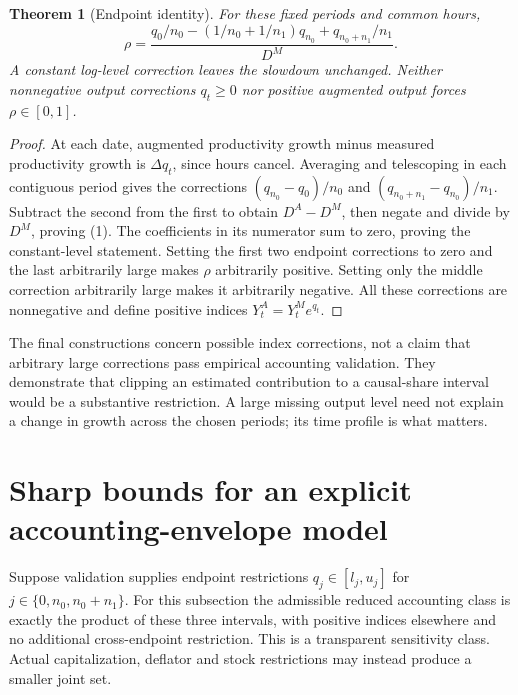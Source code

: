 \documentclass[11pt]{article}
\newtheorem{theorem}{Theorem}
\theoremstyle{definition}
\begin{document}
\begin{theorem}[Endpoint identity]
For these fixed periods and common hours,
\[
 \rho=\frac{q_0/n_0-(1/n_0+1/n_1)q_{n_0}
                     +q_{n_0+n_1}/n_1}{D^M}.
 \tag{1}
\]
A constant log-level correction leaves the slowdown unchanged. Neither nonnegative output corrections $q_t\ge0$ nor positive augmented output forces $\rho\in[0,1]$.
\end{theorem}
\begin{proof}
At each date, augmented productivity growth minus measured productivity growth is $\Delta q_t$, since hours cancel. Averaging and telescoping in each contiguous period gives the corrections $(q_{n_0}-q_0)/n_0$ and $(q_{n_0+n_1}-q_{n_0})/n_1$. Subtract the second from the first to obtain $D^A-D^M$, then negate and divide by $D^M$, proving (1). The coefficients in its numerator sum to zero, proving the constant-level statement. Setting the first two endpoint corrections to zero and the last arbitrarily large makes $\rho$ arbitrarily positive. Setting only the middle correction arbitrarily large makes it arbitrarily negative. All these corrections are nonnegative and define positive indices $Y_t^A=Y_t^Me^{q_t}$.
\end{proof}
The final constructions concern possible index corrections, not a claim that arbitrary large corrections pass empirical accounting validation. They demonstrate that clipping an estimated contribution to a causal-share interval would be a substantive restriction. A large missing output level need not explain a change in growth across the chosen periods; its time profile is what matters.

\section*{Sharp bounds for an explicit accounting-envelope model}
Suppose validation supplies endpoint restrictions $q_j\in[l_j,u_j]$ for $j\in\{0,n_0,n_0+n_1\}$. For this subsection the admissible reduced accounting class is exactly the product of these three intervals, with positive indices elsewhere and no additional cross-endpoint restriction. This is a transparent sensitivity class. Actual capitalization, deflator and stock restrictions may instead produce a smaller joint set.
\end{document}
